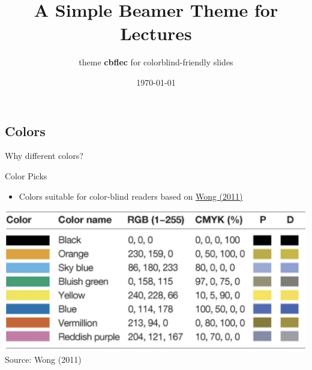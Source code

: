 \documentclass[11pt, aspectratio=43]{beamer}
\title{A Simple Beamer Theme for Lectures}
\subtitle{theme \textbf{cbflec} for colorblind-friendly slides}
\date{\today}
\begin{document}
\section{\inserttitle}
\begin{frame}[plain] %
    \titlepage
\end{frame}

\subsection{Colors}
\begin{tframe}
    \Large Why different colors?
\end{tframe}

\begin{frame}{Color Picks}
    \begin{itemize}
        \item Colors suitable for color-blind readers based on \href{https://www.nature.com/articles/nmeth.1618}{Wong (2011)}
    \end{itemize}
    \vspace{1ex}
    \begin{minipage}{\textwidth}
        \centering
        \includegraphics[scale=0.4]{cbf_colors.png}\\
        \footnotesize Source: Wong (2011)
    \end{minipage}
\end{frame}
\end{document}
